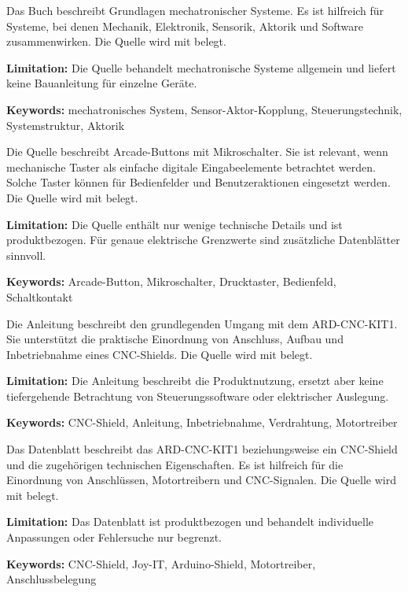 
{ 
	Das Buch beschreibt Grundlagen mechatronischer Systeme. Es ist hilfreich für Systeme, bei denen Mechanik, Elektronik, Sensorik, Aktorik und Software zusammenwirken. Die Quelle wird mit \cite{Isermann:2008} belegt.
	
	\bigskip
	
	\textbf{Limitation:} Die Quelle behandelt mechatronische Systeme allgemein und liefert keine Bauanleitung für einzelne Geräte.
	
	\scriptsize{\textbf{Keywords:} mechatronisches System, Sensor-Aktor-Kopplung, Steuerungstechnik, Systemstruktur, Aktorik}
}



{ 
	Die Quelle beschreibt Arcade-Buttons mit Mikroschalter. Sie ist relevant, wenn mechanische Taster als einfache digitale Eingabeelemente betrachtet werden. Solche Taster können für Bedienfelder und Benutzeraktionen eingesetzt werden. Die Quelle wird mit \cite{Joy-it:2024} belegt.
	
	\bigskip
	
	\textbf{Limitation:} Die Quelle enthält nur wenige technische Details und ist produktbezogen. Für genaue elektrische Grenzwerte sind zusätzliche Datenblätter sinnvoll.
	
	\scriptsize{\textbf{Keywords:} Arcade-Button, Mikroschalter, Drucktaster, Bedienfeld, Schaltkontakt}
}



{ 
	Die Anleitung beschreibt den grundlegenden Umgang mit dem ARD-CNC-KIT1. Sie unterstützt die praktische Einordnung von Anschluss, Aufbau und Inbetriebnahme eines CNC-Shields. Die Quelle wird mit \cite{JoyIT:CNCShield:Anleitung} belegt.
	
	\bigskip
	
	\textbf{Limitation:} Die Anleitung beschreibt die Produktnutzung, ersetzt aber keine tiefergehende Betrachtung von Steuerungssoftware oder elektrischer Auslegung.
	
	\scriptsize{\textbf{Keywords:} CNC-Shield, Anleitung, Inbetriebnahme, Verdrahtung, Motortreiber}
}



{ 
	Das Datenblatt beschreibt das ARD-CNC-KIT1 beziehungsweise ein CNC-Shield und die zugehörigen technischen Eigenschaften. Es ist hilfreich für die Einordnung von Anschlüssen, Motortreibern und CNC-Signalen. Die Quelle wird mit \cite{JoyIT:CNCShield:Datenblatt} belegt.
	
	\bigskip
	
	\textbf{Limitation:} Das Datenblatt ist produktbezogen und behandelt individuelle Anpassungen oder Fehlersuche nur begrenzt.
	
	\scriptsize{\textbf{Keywords:} CNC-Shield, Joy-IT, Arduino-Shield, Motortreiber, Anschlussbelegung}
}


